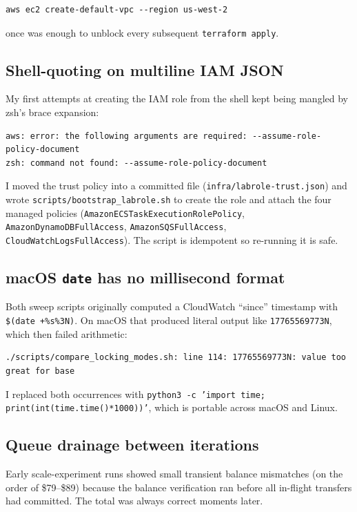 \documentclass[11pt,a4paper]{article}
\begin{document}
\begin{lstlisting}
aws ec2 create-default-vpc --region us-west-2
\end{lstlisting}

once was enough to unblock every subsequent \texttt{terraform apply}.

\subsection{Shell-quoting on multiline IAM JSON}

My first attempts at creating the IAM role from the shell kept being mangled by zsh's brace expansion:

\begin{lstlisting}
aws: error: the following arguments are required: --assume-role-policy-document
zsh: command not found: --assume-role-policy-document
\end{lstlisting}

I moved the trust policy into a committed file (\texttt{infra/labrole-trust.json}) and wrote \texttt{scripts/bootstrap\_labrole.sh} to create the role and attach the four managed policies (\texttt{AmazonECSTaskExecutionRolePolicy}, \texttt{AmazonDynamoDBFullAccess}, \texttt{AmazonSQSFullAccess}, \texttt{CloudWatchLogsFullAccess}). The script is idempotent so re-running it is safe.

\subsection{macOS \texttt{date} has no millisecond format}

Both sweep scripts originally computed a CloudWatch ``since'' timestamp with \texttt{\$(date +\%s\%3N)}. On macOS that produced literal output like \texttt{17765569773N}, which then failed arithmetic:

\begin{lstlisting}
./scripts/compare_locking_modes.sh: line 114: 17765569773N: value too great for base
\end{lstlisting}

I replaced both occurrences with \texttt{python3 -c 'import time; print(int(time.time()*1000))'}, which is portable across macOS and Linux.

\subsection{Queue drainage between iterations}

Early scale-experiment runs showed small transient balance mismatches (on the order of \$79--\$89) because the balance verification ran before all in-flight transfers had committed. The total was always correct moments later.
\end{document}

